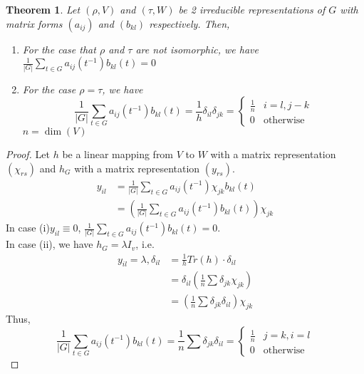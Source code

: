 \documentclass[letterpaper, leqno, 12pt]{article}
\providecommand{\abs}[1]{\left\lvert#1\right\rvert}
\newcommand {\repV} {(\rho,V)}
\newcommand {\repW} {(\tau,W)}
\theoremstyle{stdthm}
\newtheorem{thm}{Theorem}
\theoremstyle{stddef}
\theoremstyle{stdnonum}
\theoremstyle{stdqands}
\theoremstyle{stdbold}
\begin{document}
\begin{thm}
Let $\repV$ and $\repW$ be 2 irreducible representations of $G$ with matrix forms $(a_{ij})$ and $(b_{kl})$ respectively. Then, 
\begin{enumerate}
\item For the case that $\rho$ and $\tau$ are not isomorphic, we have  $\frac{1}{\abs{G}} \sum_{t \in G} a_{ij}(t^{-1})b_{kl}(t) = 0$
\item For the case $\rho = \tau$, we have 
\[\frac{1}{\abs{G}} \sum_{t\in G} a_{ij}(t^{-1}) b_{kl}(t) = \frac{1}{h} \delta_{il}\delta_{jk}
= \begin{cases}
\frac{1}{n} & i=l,j-k\\
0 &\text {otherwise}
\end{cases}
\]
$n = \dim(V)$
\end{enumerate}
\end{thm}

\begin{proof}
Let $h$ be a linear mapping from $V$ to $W$ with a matrix representation $(\chi_{rs})$ and $h_G$ with a matrix representation $(y_{rs})$. 
\begin{align*}
y_{il} &= \frac{1}{\abs{G}} \sum_{t\in G} a_{ij}(t^{-1}) \chi_{jk} b_{kl}(t)\\
&= \left( \frac{1}{\abs{G}} \sum_{t\in G} a_{ij}(t^{-1}) b_{kl}(t) \right) \chi_{jk}
\end{align*}
In case (i)$ y_{il} \equiv 0$, $\frac{1}{\abs{G}} \sum_{t \in G} a_{ij}(t^{-1})b_{kl}(t) =0$. \\

\noindent In case (ii), we have $h_G = \lambda I_v$, i.e.
\begin{align*}
 y_{il} = \lambda, \delta_{il}& = \frac{1}{h} Tr(h) \cdot \delta_{il}\\
 &= \delta_{il} \left( \frac{1}{n} \sum \delta_{jk} \chi_{jk} \right)\\
 &= \left( \frac{1}{n} \sum \delta_{jk}\delta_{il} \right) \chi_{jk}
\end{align*}
Thus, 
\[\frac{1}{\abs{G}} \sum_{t \in G} a_{ij}(t^{-1})b_{kl}(t) = \frac{1}{n} \sum \delta_{jk} \delta_{il} = 
\begin{cases}
\frac{1}{n} & j=k,i=l\\
0 &\text{otherwise}
\end{cases}
\]
\end{proof}
\end{document}
